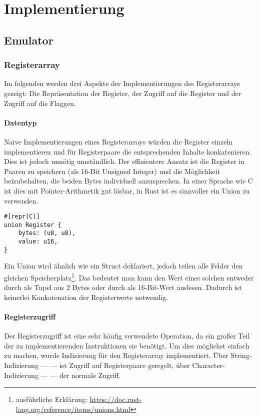 \chapter{Implementierung}\label{chap:impl}

\section{Emulator}

\subsection{Registerarray}

Im folgenden werden drei Aspekte der Implementierungen des Registerarrays gezeigt: Die Repräsentation der Register, der Zugriff auf die Register und der Zugriff auf die Flaggen.

\subsubsection{Datentyp}

Naive Implementierungen eines Registerarrays würden die Register einzeln implementieren und für Registerpaare die entsprechenden Inhalte konkatenieren.
Dies ist jedoch unnötig umständlich. Der effizientere Ansatz ist die Register in Paaren zu speichern (als 16-Bit Unsigned Integer) und die Möglichkeit beizubehalten, die beiden Bytes individuell anzusprechen. In einer Sprache wie C ist dies mit Pointer-Arithmetik gut lösbar, in Rust ist es sinnvoller ein Union zu verwenden.

\begin{verbatim}
#[repr(C)]
union Register {
    bytes: (u8, u8),
    value: u16,
}
\end{verbatim}

Ein Union wird ähnlich wie ein Struct deklariert, jedoch teilen alle Felder den gleichen Speicherplatz\footnote{ausführliche Erklärung: \url{https://doc.rust-lang.org/reference/items/unions.html}}. Das bedeutet man kann den Wert eines solchen  entweder durch  als Tupel aus 2 Bytes oder durch  als 16-Bit-Wert auslesen. Dadurch ist keinerlei Konkatenation der Registerwerte notwendig.

\subsubsection{Registerzugriff}

Der Registerzugriff ist eine sehr häufig verwendete Operation, da ein großer Teil der zu implementierenden Instruktionen sie benötigt. Um dies möglichst einfach zu machen, wurde Indizierung für den Registerarray implementiert. Über String-Indizierung ---  --- ist Zugriff auf Registerpaare geregelt, über Character-Indizierung ---  --- der normale Zugriff.

